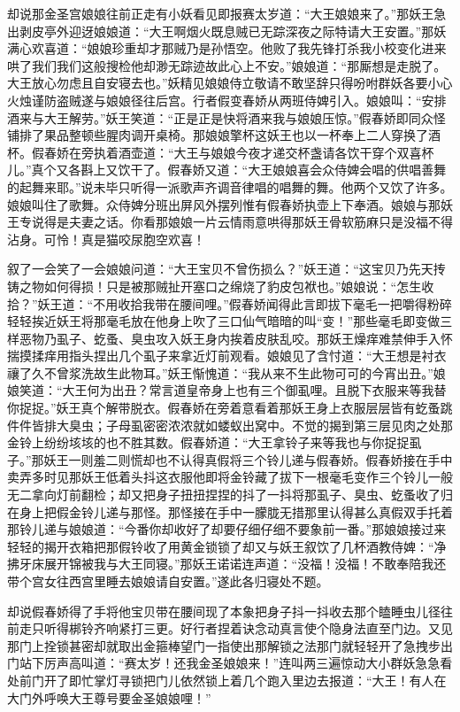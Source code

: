 \documentclass[12pt,UTF8]{ctexbook}
\begin{document}
却说那金圣宫娘娘往前正走有小妖看见即报赛太岁道：“大王娘娘来了。”那妖王急出剥皮亭外迎迓娘娘道：“大王啊烟火既息贼已无踪深夜之际特请大王安置。”那妖满心欢喜道：“娘娘珍重却才那贼乃是孙悟空。他败了我先锋打杀我小校变化进来哄了我们我们这般搜检他却渺无踪迹故此心上不安。”娘娘道：“那厮想是走脱了。大王放心勿虑且自安寝去也。”妖精见娘娘侍立敬请不敢坚辞只得吩咐群妖各要小心火烛谨防盗贼遂与娘娘径往后宫。行者假变春娇从两班侍婢引入。娘娘叫：“安排酒来与大王解劳。”妖王笑道：“正是正是快将酒来我与娘娘压惊。”假春娇即同众怪铺排了果品整顿些腥肉调开桌椅。那娘娘擎杯这妖王也以一杯奉上二人穿换了酒杯。假春娇在旁执着酒壶道：“大王与娘娘今夜才递交杯盏请各饮干穿个双喜杯儿。”真个又各斟上又饮干了。假春娇又道：“大王娘娘喜会众侍婢会唱的供唱善舞的起舞来耶。”说未毕只听得一派歌声齐调音律唱的唱舞的舞。他两个又饮了许多。娘娘叫住了歌舞。众侍婢分班出屏风外摆列惟有假春娇执壶上下奉酒。娘娘与那妖王专说得是夫妻之话。你看那娘娘一片云情雨意哄得那妖王骨软筋麻只是没福不得沾身。可怜！真是猫咬尿胞空欢喜！

叙了一会笑了一会娘娘问道：“大王宝贝不曾伤损么？”妖王道：“这宝贝乃先天抟铸之物如何得损！只是被那贼扯开塞口之绵烧了豹皮包袱也。”娘娘说：“怎生收拾？”妖王道：“不用收拾我带在腰间哩。”假春娇闻得此言即拔下毫毛一把嚼得粉碎轻轻挨近妖王将那毫毛放在他身上吹了三口仙气暗暗的叫“变！”那些毫毛即变做三样恶物乃虱子、虼蚤、臭虫攻入妖王身内挨着皮肤乱咬。那妖王燥痒难禁伸手入怀揣摸揉痒用指头捏出几个虱子来拿近灯前观看。娘娘见了含忖道：“大王想是衬衣禳了久不曾浆洗故生此物耳。”妖王惭愧道：“我从来不生此物可可的今宵出丑。”娘娘笑道：“大王何为出丑？常言道皇帝身上也有三个御虱哩。且脱下衣服来等我替你捉捉。”妖王真个解带脱衣。假春娇在旁着意看着那妖王身上衣服层层皆有虼蚤跳件件皆排大臭虫；子母虱密密浓浓就如蝼蚁出窝中。不觉的揭到第三层见肉之处那金铃上纷纷垓垓的也不胜其数。假春娇道：“大王拿铃子来等我也与你捉捉虱子。”那妖王一则羞二则慌却也不认得真假将三个铃儿递与假春娇。假春娇接在手中卖弄多时见那妖王低着头抖这衣服他即将金铃藏了拔下一根毫毛变作三个铃儿一般无二拿向灯前翻检；却又把身子扭扭捏捏的抖了一抖将那虱子、臭虫、虼蚤收了归在身上把假金铃儿递与那怪。那怪接在手中一朦胧无措那里认得甚么真假双手托着那铃儿递与娘娘道：“今番你却收好了却要仔细仔细不要象前一番。”那娘娘接过来轻轻的揭开衣箱把那假铃收了用黄金锁锁了却又与妖王叙饮了几杯酒教侍婢：“净拂牙床展开锦被我与大王同寝。”那妖王诺诺连声道：“没福！没福！不敢奉陪我还带个宫女往西宫里睡去娘娘请自安置。”遂此各归寝处不题。

却说假春娇得了手将他宝贝带在腰间现了本象把身子抖一抖收去那个瞌睡虫儿径往前走只听得梆铃齐响紧打三更。好行者捏着诀念动真言使个隐身法直至门边。又见那门上拴锁甚密却就取出金箍棒望门一指使出那解锁之法那门就轻轻开了急拽步出门站下厉声高叫道：“赛太岁！还我金圣娘娘来！”连叫两三遍惊动大小群妖急急看处前门开了即忙掌灯寻锁把门儿依然锁上着几个跑入里边去报道：“大王！有人在大门外呼唤大王尊号要金圣娘娘哩！”
\end{document}
